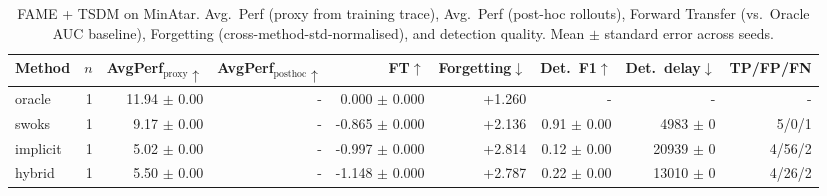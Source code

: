 \begin{table}[t]
\centering
\caption{FAME + TSDM on MinAtar. Avg.~Perf (proxy from training trace), Avg.~Perf (post-hoc rollouts), Forward Transfer (vs.~Oracle AUC baseline), Forgetting (cross-method-std-normalised), and detection quality. Mean $\pm$ standard error across seeds.}
\label{tab:fame-tsdm}
\begin{tabular}{lrrrrrrrr}
\toprule
Method & $n$ & AvgPerf$_{\text{proxy}}\uparrow$ & AvgPerf$_{\text{posthoc}}\uparrow$ & FT$\uparrow$ & Forgetting$\downarrow$ & Det.\ F1$\uparrow$ & Det.\ delay$\downarrow$ & TP/FP/FN \\
\midrule
oracle & 1 & 11.94 $\pm$ 0.00 & - & 0.000 $\pm$ 0.000 & +1.260 & - & - & - \\
swoks & 1 & 9.17 $\pm$ 0.00 & - & -0.865 $\pm$ 0.000 & +2.136 & 0.91 $\pm$ 0.00 & 4983 $\pm$ 0 & 5/0/1 \\
implicit & 1 & 5.02 $\pm$ 0.00 & - & -0.997 $\pm$ 0.000 & +2.814 & 0.12 $\pm$ 0.00 & 20939 $\pm$ 0 & 4/56/2 \\
hybrid & 1 & 5.50 $\pm$ 0.00 & - & -1.148 $\pm$ 0.000 & +2.787 & 0.22 $\pm$ 0.00 & 13010 $\pm$ 0 & 4/26/2 \\
\bottomrule
\end{tabular}
\end{table}

